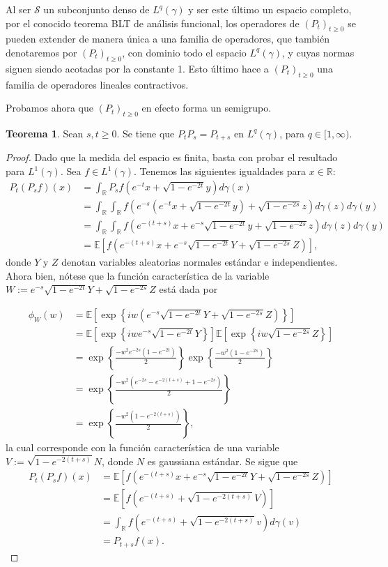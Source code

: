 \documentclass[letterpaper,twoside,12pt]{book}
\newcommand{\R}{\mathbb{R}}
\renewcommand{\S}{\mathcal{S}}
\newcommand{\E}{\mathbb{E}}
\newcommand{\1}{\mathds{1}}
\theoremstyle{definition}
\theoremstyle{definition}
\newtheorem{teo}{Teorema}
\theoremstyle{remark}
\theoremstyle{definition}
\theoremstyle{definition}
\theoremstyle{definition}
\theoremstyle{definition}
\theoremstyle{definition}
\begin{document}
Al ser $\S$ un subconjunto denso de $L^q(\gamma)$ y ser este último un espacio completo, por el conocido teorema BLT de análisis funcional, los operadores de $(P_t)_{t\geq0}$ se pueden extender de manera única a una familia de operadores, que también denotaremos por $(P_t)_{t\geq0}$, con dominio todo el espacio $L^q(\gamma)$, y cuyas normas siguen siendo acotadas por la constante 1. Esto último hace a $(P_t)_{t\geq0}$ una familia de operadores lineales contractivos.

Probamos ahora que $(P_t)_{t\geq0}$ en efecto forma un semigrupo.
\begin{teo} 
Sean $s,t\geq0$. Se tiene que $P_tP_s=P_{t+s}$ en $L^q(\gamma)$, para $q\in [1,\infty)$.
\end{teo}
\begin{proof} 
  Dado que la medida del espacio es finita, basta con probar el resultado para $L^1(\gamma)$. Sea $f\in L^1(\gamma)$. Tenemos las siguientes igualdades para $x\in \R$:
\begin{align*}
   P_{t}(P_sf)(x)&=\int_\R P_sf\left(e^{-t}x+\sqrt{1-e^{-2t}}y\right)d\gamma(x)\\
   &=\int_\R \int_\R f\left(e^{-s}(e^{-t}x+\sqrt{1-e^{-2t}}y)+\sqrt{1-e^{-2s}}z\right)d\gamma(z)d\gamma(y)\\
   &=\int_\R\int_\R f \left(e^{-(t+s)}x+e^{-s}\sqrt{1-e^{-2t}}y+\sqrt{1-e^{-2s}}z\right)d\gamma(z)d\gamma(y)\\
   &=\E\left[f \left(e^{-(t+s)}x+e^{-s}\sqrt{1-e^{-2t}}Y+\sqrt{1-e^{-2s}}Z\right)\right],
\end{align*}
donde $Y$ y $Z$ denotan variables aleatorias normales estándar e independientes. Ahora bien, nótese que la función característica de la variable $W:=e^{-s}\sqrt{1-e^{-2t}}Y+\sqrt{1-e^{-2s}}Z$ está dada por 

\begin{align*}
   \phi_W(w)&=\E\left[\exp \left\{iw(e^{-s}\sqrt{1-e^{-2t}}Y+\sqrt{1-e^{-2s}}Z)\right\}\right]\\
   &=\E\left[\exp \left\{iwe^{-s}\sqrt{1-e^{-2t}}Y\right\}\right]\E\left[\exp \left\{iw\sqrt{1-e^{-2s}}Z\right\}\right]\\
   &=\exp \left\{\frac{-w^2e^{-2s}(1-e^{-2t})}{2}\right\}\exp \left\{\frac{-w^2(1-e^{-2s})}{2}\right\}\\
   &=\exp \left\{\frac{-w^2(e^{-2s}-e^{-2(t+s)}+1-e^{-2s})}{2}\right\}\\
   &=\exp \left\{\frac{-w^2(1-e^{-2(t+s)})}{2}\right\},
\end{align*}
la cual corresponde con la función característica de una variable $V:=\sqrt{1-e^{-2(t+s)}}N$, donde $N$ es gaussiana estándar. Se sigue que 
\begin{align*}
   P_{t}(P_sf)(x)&=\E\left[f \left(e^{-(t+s)}x+e^{-s}\sqrt{1-e^{-2t}}Y+\sqrt{1-e^{-2s}}Z\right)\right]\\
   &=\E\left[f \left(e^{-(t+s)}+\sqrt{1-e^{-2(t+s)}}V\right)\right]\\
   &=\int_\R f \left(e^{-(t+s)}+\sqrt{1-e^{-2(t+s)}}v\right)d\gamma(v)\\
   &=P_{t+s}f(x).
\end{align*}
 \end{proof}
\end{document}
